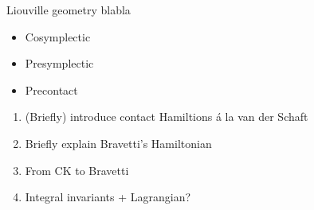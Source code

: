 \begin{mathbox}{Liouville geometry}
    blabla
\end{mathbox}


\begin{itemize}
    \item Cosymplectic
    \item Presymplectic
    \item Precontact
\end{itemize}


\begin{enumerate}
    \item (Briefly) introduce contact Hamiltions á la van der Schaft 
    \item Briefly explain Bravetti's Hamiltonian
    \item From CK to Bravetti
    \item Integral invariants + Lagrangian?
\end{enumerate}

%
